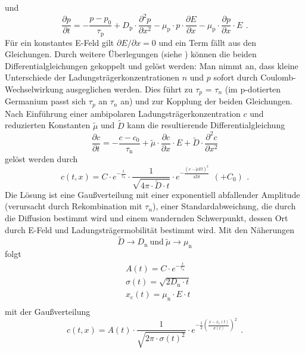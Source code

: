 und
\begin{equation}
\label{}
\frac{\partial p}{\partial t}=
-\frac{p-p_0}{\tau_{\text{p}}}
+ D_{\text{p}} \cdot \frac{\partial^2 p}{\partial x^2}
- \mu_{\text{p}} \cdot p \cdot \frac{\partial E}{\partial x}
- \mu_{\text{p}} \cdot \frac{\partial p}{\partial x} \cdot E \ \,.
\end{equation} 
Für ein konstantes E-Feld gilt $\partial E / \partial x = 0$ und ein Term fällt aus den Gleichungen.
Durch weitere Überlegungen (siehe \cite{staatsex}) können die beiden Differentialgleichungen
gekoppelt und gelöst werden:
Man nimmt an, dass kleine Unterschiede der Ladungsträgerkonzentrationen $n$ und $p$
sofort durch Coulomb-Wechselwirkung ausgeglichen werden. Dies führt zu $\tau_p$ = $\tau_n$
(im p-dotierten Germanium passt sich $\tau_p$ an $\tau_n$ an)
und zur Kopplung der beiden Gleichungen.\\
Nach Einführung einer ambipolaren Ladungsträgerkonzentration $c$ und reduzierten Konstanten
$\tilde{\mu}$ und $\tilde{D}$ kann die resultierende Differentialgleichung
\begin{equation}
\label{}
\frac{\partial c}{\partial t}=
-\frac{c-c_0}{\tau_{\text{n}}}
+ \tilde{\mu} \cdot \frac{\partial c}{\partial x} \cdot E
+ \tilde{D} \cdot \frac{\partial^2 c}{\partial x^2}
\end{equation}
gelöst werden durch
\begin{equation}
\label{}
c(t,x) = C \cdot e^{-\frac{t}{\tau_n}}
\cdot
\frac{1}{\sqrt{4  \pi  \cdot \tilde{D}  \cdot t}}
\cdot
e^{-\frac{(x - \tilde{\mu} E t)^2}{4 \tilde{D}  t}}
\ \ (+ C_0) \ \, .
\end{equation}
Die Lösung ist eine Gaußverteilung mit einer exponentiell abfallender Amplitude
(verursacht durch Rekombination mit $\tau_n$),
einer Standardabweichung, die durch die Diffusion bestimmt wird
und einem wandernden Schwerpunkt, dessen Ort durch E-Feld und Ladungsträgermobilität bestimmt wird.
Mit den Näherungen
\begin{equation}
\label{}
\tilde{D} \rightarrow D_{\text{n}} \ \text{und} \ \tilde{\mu} \rightarrow \mu_{\text{n}}
\end{equation}
folgt
\begin{equation}
\label{}
\begin{split}
& A(t) = C \cdot e^{-\frac{t}{\tau_n}}\\
& \sigma(t) = \sqrt{2 D_{\text{n}} \cdot t}\\
& x_{\text{c}}(t) = \mu_{\text{n}} \cdot E \cdot t\\
\end{split}
\end{equation}
mit der Gaußverteilung
\begin{equation}
\label{}
c(t,x) = A(t) \cdot \frac{1}{\sqrt{2 \pi \cdot \sigma(t)^2}} \cdot
e^{-\frac{1}{2} (\frac{x-x_{\text{c}}(t)}{\sigma(t)})^2} \ \, .
\end{equation}
